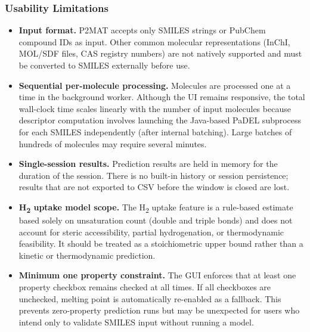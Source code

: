 \subsubsection*{Usability Limitations}
\begin{itemize}
  \item \textbf{Input format.}
        P2MAT accepts only SMILES strings or PubChem compound IDs as input.
        Other common molecular representations (InChI, MOL/SDF files, CAS
        registry numbers) are not natively supported and must be converted to
        SMILES externally before use.

  \item \textbf{Sequential per-molecule processing.}
        Molecules are processed one at a time in the background worker.
        Although the UI remains responsive, the total wall-clock time scales
        linearly with the number of input molecules because descriptor
        computation involves launching the Java-based PaDEL subprocess for each
        SMILES independently (after internal batching).
        Large batches of hundreds of molecules may require several minutes.

  \item \textbf{Single-session results.}
        Prediction results are held in memory for the duration of the session.
        There is no built-in history or session persistence; results that are
        not exported to CSV before the window is closed are lost.

  \item \textbf{H\textsubscript{2} uptake model scope.}
        The H\textsubscript{2} uptake feature is a rule-based estimate based
        solely on unsaturation count (double and triple bonds) and does not
        account for steric accessibility, partial hydrogenation, or
        thermodynamic feasibility.
        It should be treated as a stoichiometric upper bound rather than a
        kinetic or thermodynamic prediction.

  \item \textbf{Minimum one property constraint.}
        The GUI enforces that at least one property checkbox remains checked at
        all times.
        If all checkboxes are unchecked, melting point is automatically
        re-enabled as a fallback.
        This prevents zero-property prediction runs but may be unexpected for
        users who intend only to validate SMILES input without running a model.
\end{itemize}
